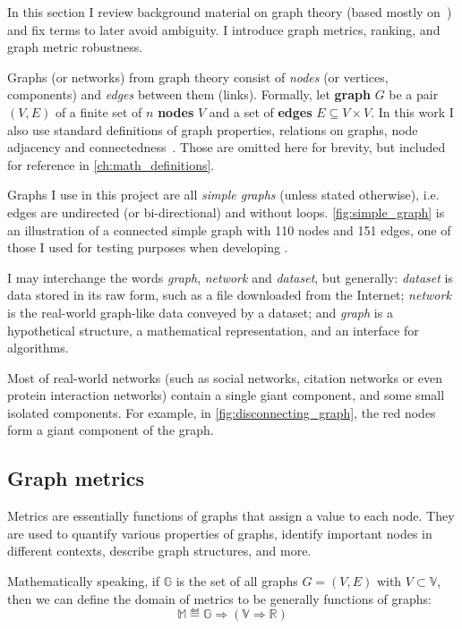 In this section I review background material on graph theory (based mostly on~\cite{Estrada2017}) and fix terms to later avoid ambiguity.
I introduce graph metrics, ranking, and graph metric robustness.



Graphs (or networks) from graph theory consist of \textit{nodes} (or vertices, components) and \textit{edges} between them (links).
Formally, let \textbf{graph} $G$ be a pair $(V, E)$ of a finite set of $n$ \textbf{nodes} $V$ and a set of \textbf{edges} $E \subseteq V \times V$.
In this work I also use standard definitions of graph properties, relations on graphs, node adjacency and connectedness~\cite{Estrada2017}.
Those are omitted here for brevity, but included for reference in \cref{ch:math_definitions}.

Graphs I use in this project are all \textsl{simple graphs} (unless stated otherwise), i.e. edges are undirected (or bi-directional) and without loops.
\autoref{fig:simple_graph} is an illustration of a connected simple graph with 110 nodes and 151 edges, one of those I used for testing purposes when developing \graffs.

I may interchange the words \textsl{graph}, \textsl{network} and \textsl{dataset}, but generally: \textsl{dataset} is data stored in its raw form, such as a file downloaded from the Internet; \textsl{network} is the real-world graph-like data conveyed by a dataset; and \textsl{graph} is a hypothetical structure, a mathematical representation, and an interface for algorithms.



Most of real-world networks (such as social networks, citation networks or even protein interaction networks) contain a single giant component, and some small isolated components.
For example, in \autoref{fig:disconnecting_graph}, the red nodes form a giant component of the graph.

\subsection{Graph metrics}

Metrics are essentially functions of graphs that assign a value to each node.
They are used to quantify various properties of graphs, identify important nodes in different contexts, describe graph structures, and more.

Mathematically speaking, if $\mathbb{G}$ is the set of all graphs $G = (V, E)$ with $V \subset \mathbb{V}$, then we can define the domain of metrics to be generally functions of graphs:
\begin{equation}
    \label{eq:metric_type_def}
    \mathbb{M} \eqdef \mathbb{G} \Rightarrow (\mathbb{V} \Rightarrow \mathbb{R})
\end{equation}


